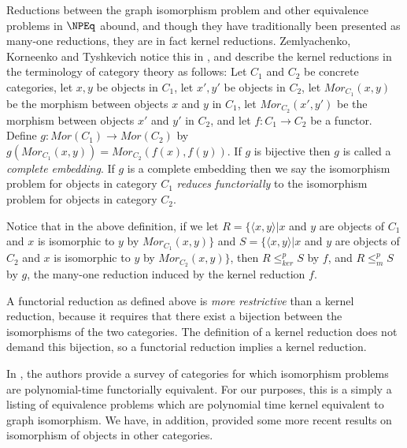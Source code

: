 \documentclass{article}
\theoremstyle{definition} \newtheorem{definition}[definition]{Definition}
\newcommand{\kr}{\leq^{p}_{ker}} %
\newcommand{\mor}{\leq^{p}_{m}} %
\newcommand{\defn}[1]{\emph{#1}} %
\newcommand{\pair}[2]{\langle#1,#2\rangle} %
\begin{document}
Reductions between the graph isomorphism problem and other equivalence problems
in $\NPEq$ abound, and though they have traditionally been presented as
many-one reductions, they are in fact kernel reductions. Zemlyachenko,
Korneenko and Tyshkevich notice this in \cite{zkt85}, and describe the kernel
reductions in the terminology of category theory as follows: Let $C_1$ and
$C_2$ be concrete categories, let $x,y$ be objects in $C_1$, let $x', y'$ be
objects in $C_2$, let $Mor_{C_1}(x,y)$ be the morphism between objects $x$ and
$y$ in $C_1$, let $Mor_{C_2}(x',y')$ be the morphism between objects $x'$ and
$y'$ in $C_2$, and let $f\colon C_1\to C_2$ be a functor. Define $g\colon
Mor(C_1)\to Mor(C_2)$ by $g(Mor_{C_1}(x,y))=Mor_{C_2}(f(x), f(y))$. If $g$ is
bijective then $g$ is called a \defn{complete embedding}. If $g$ is a complete
embedding then we say the isomorphism problem for objects in category $C_1$
\defn{reduces functorially} to the isomorphism problem for objects in category
$C_2$.

Notice that in the above definition, if we let $R=\{\pair{x}{y}| x$ and $y$ are
objects of $C_1$ and $x$ is isomorphic to $y$ by $Mor_{C_1}(x,y)\}$ and
$S=\{\pair{x}{y}| x$ and $y$ are objects of $C_2$ and $x$ is isomorphic to $y$
by $Mor_{C_2}(x,y)\}$, then $R\kr S$ by $f$, and $R\mor S$ by $g$, the many-one
reduction induced by the kernel reduction $f$.

A functorial reduction as defined above is \emph{more restrictive} than a
kernel reduction, because it requires that there exist a bijection between the
isomorphisms of the two categories. The definition of a kernel reduction does
not demand this bijection, so a functorial reduction implies a kernel
reduction.

In \cite{zkt85}, the authors provide a survey of categories for which
isomorphism problems are polynomial-time functorially equivalent. For our
purposes, this is a simply a listing of equivalence problems which are
polynomial time kernel equivalent to graph isomorphism. We have, in addition,
provided some more recent results on isomorphism of objects in other
categories.
\end{document}
